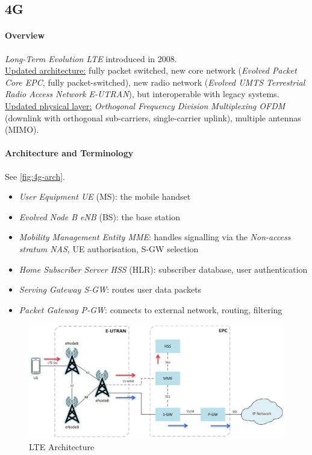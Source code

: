 \subsection{4G}

\paragraph{Overview}
\textit{Long-Term Evolution LTE} introduced in 2008.
\\
\underline{Updated architecture:}
fully packet switched, new core network (\textit{Evolved Packet Core EPC}, fully packet-switched), new radio network (\textit{Evolved UMTS Terrestrial Radio Access Network E-UTRAN}), but interoperable with legacy systems.
\\
\underline{Updated physical layer:}
\textit{Orthogonal Frequency Division Multiplexing OFDM} (downlink with orthogonal sub-carriers, single-carrier uplink), multiple antennas (MIMO).

\paragraph{Architecture and Terminology}
See \autoref{fig:4g-arch}.
\begin{itemize}
	\item \textit{User Equipment UE} (MS): the mobile handset
	\item \textit{Evolved Node B eNB} (BS): the base station
	\item \textit{Mobility Management Entity MME}: handles signalling via the \textit{Non-access stratum NAS}, UE authorisation, S-GW selection
	\item \textit{Home Subscriber Server HSS} (HLR): subscriber database, user authentication
	\item \textit{Serving Gateway S-GW}:  routes user data packets
	\item \textit{Packet Gateway P-GW}: connects to external network, routing, filtering
\end{itemize}

\begin{figure}
	\centering
	\includegraphics[scale=0.5]{images/10-4g-arch.png}
	\caption{LTE Architecture}
	\label{fig:4g-arch}
\end{figure}

